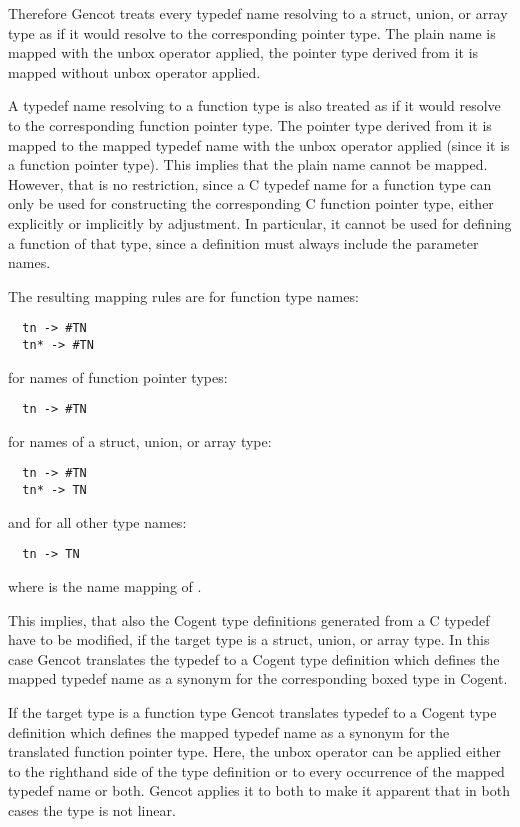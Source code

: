 Therefore Gencot treats every typedef name resolving to a struct, union, or array type as if 
it would resolve to the corresponding pointer type. The plain name is mapped with the unbox operator 
applied, the pointer type derived from it is mapped without unbox operator applied. 

A typedef name resolving to a function type is also treated as if it would resolve to the corresponding 
function pointer type. The pointer type derived from it is mapped to the mapped typedef name with the
unbox operator applied (since it is a function pointer type). This implies that the plain name cannot
be mapped. However, that is no restriction, since a C typedef name for a function type can only be used
for constructing the corresponding C function pointer type, either explicitly or implicitly by adjustment.
In particular, it cannot be used for defining a function of that type, since a definition must always 
include the parameter names.

The resulting mapping rules are for function type names:
\begin{verbatim}
  tn -> #TN
  tn* -> #TN
\end{verbatim}
for names of function pointer types:
\begin{verbatim}
  tn -> #TN
\end{verbatim}
for names of a struct, union, or array type:
\begin{verbatim}
  tn -> #TN
  tn* -> TN
\end{verbatim}
and for all other type names:
\begin{verbatim}
  tn -> TN
\end{verbatim}
where  is the name mapping of .

This implies, that also the Cogent type definitions generated from a C typedef have to be modified, if
the target type is a struct, union, or array type. In this case Gencot translates the typedef 
to a Cogent type definition which defines the mapped typedef name as a synonym 
for the corresponding boxed type in Cogent.

If the target type is a function type Gencot translates typedef to a Cogent type definition which
defines the mapped typedef name as a synonym for the translated function pointer type. Here, the unbox
operator can be applied either to the righthand side of the type definition or to every occurrence
of the mapped typedef name or both. Gencot applies it to both to make it apparent that in both cases
the type is not linear.

